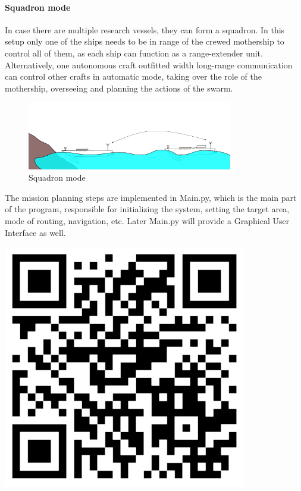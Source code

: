 \paragraph{Squadron mode}
In case there are multiple research vessels, they can form a squadron. In this setup only one of the ships needs to be in range of the crewed mothership to control all of them, as each ship can function as a range-extender unit. Alternatively, one autonomous craft outfitted width long-range communication can control other crafts in automatic mode, taking over the role of the mothership, overseeing and planning the actions of the swarm.

\begin{figure}[H]
	\centering
	\includegraphics[width=0.8\textwidth]{img/multiple}
	\caption{Squadron mode}
	\label{fig:multiple}
\end{figure}

\begin{tcolorbox}[colback=cyan!5,colframe=cyan!40!black,title=Code: Main.py \\ https://www.dropbox.com/s/h1067ywmdajkegk/Main.py]
\begin{minipage}{0,6\textwidth}
The mission planning steps are implemented in Main.py, which is the main part of the program, responsible for initializing the system, setting the target area, mode of routing, navigation, etc. Later Main.py will provide a Graphical User Interface as well.
\end{minipage}
\begin{minipage}{0,35\textwidth}
\raggedleft
\includegraphics[width=0.8\textwidth]{img/main}
\end{minipage}

\end{tcolorbox}

